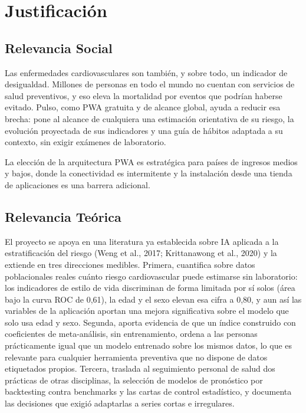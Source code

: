 \documentclass[12pt,letterpaper]{article}
\begin{document}
\newpage

\section{Justificación}

\subsection{Relevancia Social}

Las enfermedades cardiovasculares son también, y sobre todo, un indicador de
desigualdad. Millones de personas en todo el mundo no cuentan con servicios de
salud preventivos, y eso eleva la mortalidad por eventos que podrían haberse
evitado. Pulso, como PWA gratuita y de alcance global, ayuda a reducir esa
brecha: pone al alcance de cualquiera una estimación orientativa de su riesgo, la
evolución proyectada de sus indicadores y una guía de hábitos adaptada a su
contexto, sin exigir exámenes de laboratorio.

La elección de la arquitectura PWA es estratégica para países de ingresos medios
y bajos, donde la conectividad es intermitente y la instalación desde una tienda
de aplicaciones es una barrera adicional.

\subsection{Relevancia Teórica}

El proyecto se apoya en una literatura ya establecida sobre IA aplicada a la
estratificación del riesgo (Weng et al., 2017; Krittanawong et al., 2020) y la
extiende en tres direcciones medibles. Primera, cuantifica sobre datos
poblacionales reales cuánto riesgo cardiovascular puede estimarse sin
laboratorio: los indicadores de estilo de vida discriminan de forma limitada por
sí solos (área bajo la curva ROC de 0,61), la edad y el sexo elevan esa cifra a
0,80, y aun así las variables de la aplicación aportan una mejora significativa
sobre el modelo que solo usa edad y sexo. Segunda, aporta evidencia de que un
índice construido con coeficientes de meta-análisis, sin entrenamiento, ordena a
las personas prácticamente igual que un modelo entrenado sobre los mismos datos,
lo que es relevante para cualquier herramienta preventiva que no dispone de
datos etiquetados propios. Tercera, traslada al seguimiento personal de salud dos
prácticas de otras disciplinas, la selección de modelos de pronóstico por
backtesting contra benchmarks y las cartas de control estadístico, y documenta
las decisiones que exigió adaptarlas a series cortas e irregulares.
\end{document}
